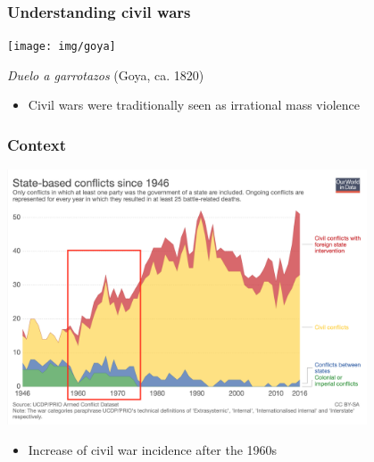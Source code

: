 \documentclass[utf8, xcolor=dvipsnames]{beamer}
\begin{document}
\begin{frame}
\frametitle{Understanding civil wars}
\centering

\texttt{[image: img/goya]}

\textit{Duelo a garrotazos} (Goya, ca. 1820)

\vspace{15pt}

\begin{itemize}
  \item Civil wars were traditionally seen as irrational mass violence
\end{itemize}

\end{frame}

\begin{frame}
\frametitle{Context}
\centering

\includegraphics[width = 0.8\textwidth]{img/conflicts_over_time2}

\begin{itemize}
  \item Increase of civil war incidence after the 1960s
\end{itemize}

\end{frame}
\end{document}
